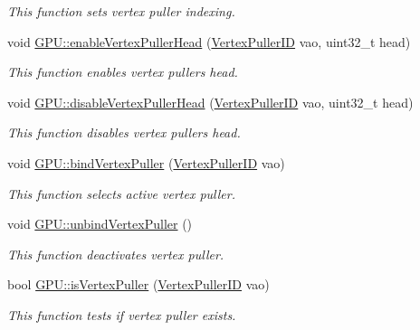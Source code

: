 \begin{DoxyCompactItemize}
\begin{DoxyCompactList}\small\item\em This function sets vertex puller indexing. \end{DoxyCompactList}\item 
void \hyperlink{group__vertexpuller__tasks_ga61384d99754bda4d91790c49b1639b30}{G\+P\+U\+::enable\+Vertex\+Puller\+Head} (\hyperlink{fwd_8hpp_af6f78f73099477c9ce5537d657597486}{Vertex\+Puller\+ID} vao, uint32\+\_\+t head)
\begin{DoxyCompactList}\small\item\em This function enables vertex puller\textquotesingle{}s head. \end{DoxyCompactList}\item 
void \hyperlink{group__vertexpuller__tasks_gae95cab56d80cb888e71b25965dc868c5}{G\+P\+U\+::disable\+Vertex\+Puller\+Head} (\hyperlink{fwd_8hpp_af6f78f73099477c9ce5537d657597486}{Vertex\+Puller\+ID} vao, uint32\+\_\+t head)
\begin{DoxyCompactList}\small\item\em This function disables vertex puller\textquotesingle{}s head. \end{DoxyCompactList}\item 
void \hyperlink{group__vertexpuller__tasks_gac7f9799e1a6a3b1cafb5f4c4c5e9555d}{G\+P\+U\+::bind\+Vertex\+Puller} (\hyperlink{fwd_8hpp_af6f78f73099477c9ce5537d657597486}{Vertex\+Puller\+ID} vao)
\begin{DoxyCompactList}\small\item\em This function selects active vertex puller. \end{DoxyCompactList}\item 
void \hyperlink{group__vertexpuller__tasks_gafdfb7e3cd24d595af6650b68ba9f6f24}{G\+P\+U\+::unbind\+Vertex\+Puller} ()
\begin{DoxyCompactList}\small\item\em This function deactivates vertex puller. \end{DoxyCompactList}\item 
bool \hyperlink{group__vertexpuller__tasks_ga09408b5ca4250292217f3330ae674319}{G\+P\+U\+::is\+Vertex\+Puller} (\hyperlink{fwd_8hpp_af6f78f73099477c9ce5537d657597486}{Vertex\+Puller\+ID} vao)
\begin{DoxyCompactList}\small\item\em This function tests if vertex puller exists. \end{DoxyCompactList}\end{DoxyCompactItemize}


